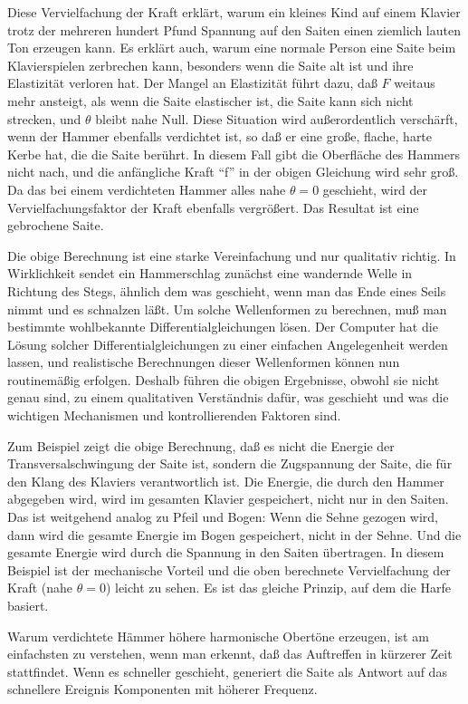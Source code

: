 Diese Vervielfachung der Kraft erklärt, warum ein kleines Kind auf einem Klavier trotz der mehreren hundert Pfund Spannung auf den Saiten einen ziemlich lauten Ton erzeugen kann.
Es erklärt auch, warum eine normale Person eine Saite beim Klavierspielen zerbrechen kann, besonders wenn die Saite alt ist und ihre Elastizität verloren hat.
Der Mangel an Elastizität führt dazu, daß $F$ weitaus mehr ansteigt, als wenn die Saite elastischer ist, die Saite kann sich nicht strecken, und $\theta$ bleibt nahe Null.
Diese Situation wird außerordentlich verschärft, wenn der Hammer ebenfalls verdichtet ist, so daß er eine große, flache, harte Kerbe hat, die die Saite berührt.
In diesem Fall gibt die Oberfläche des Hammers nicht nach, und die anfängliche Kraft \enquote{f} in der obigen Gleichung wird sehr groß.
Da das bei einem verdichteten Hammer alles nahe $\theta = 0$ geschieht, wird der Vervielfachungsfaktor der Kraft ebenfalls vergrößert.
Das Resultat ist eine gebrochene Saite.

Die obige Berechnung ist eine starke Vereinfachung und nur qualitativ richtig.
In Wirklichkeit sendet ein Hammerschlag zunächst eine wandernde Welle in Richtung des Stegs, ähnlich dem was geschieht, wenn man das Ende eines Seils nimmt und es schnalzen läßt.
Um solche Wellenformen zu berechnen, muß man bestimmte wohlbekannte Differentialgleichungen lösen.
Der Computer hat die Lösung solcher Differentialgleichungen zu einer einfachen Angelegenheit werden lassen, und realistische Berechnungen dieser Wellenformen können nun routinemäßig erfolgen.
Deshalb führen die obigen Ergebnisse, obwohl sie nicht genau sind, zu einem qualitativen Verständnis dafür, was geschieht und was die wichtigen Mechanismen und kontrollierenden Faktoren sind.

Zum Beispiel zeigt die obige Berechnung, daß es nicht die Energie der Transversalschwingung der Saite ist, sondern die Zugspannung der Saite, die für den Klang des Klaviers verantwortlich ist.
Die Energie, die durch den Hammer abgegeben wird, wird im gesamten Klavier gespeichert, nicht nur in den Saiten.
Das ist weitgehend analog zu Pfeil und Bogen: Wenn die Sehne gezogen wird, dann wird die gesamte Energie im Bogen gespeichert, nicht in der Sehne.
Und die gesamte Energie wird durch die Spannung in den Saiten übertragen.
In diesem Beispiel ist der mechanische Vorteil und die oben berechnete Vervielfachung der Kraft (nahe $\theta = 0$) leicht zu sehen.
Es ist das gleiche Prinzip, auf dem die Harfe basiert.

Warum verdichtete Hämmer höhere harmonische Obertöne erzeugen, ist am einfachsten zu verstehen, wenn man erkennt, daß das Auftreffen in kürzerer Zeit stattfindet.
Wenn es schneller geschieht, generiert die Saite als Antwort auf das schnellere Ereignis Komponenten mit höherer Frequenz.

